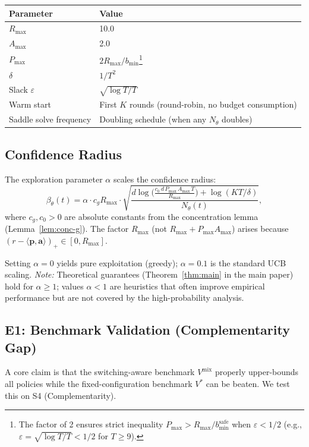 \documentclass[11pt]{article}
\newcommand{\ba}{\mathbf{a}}
\newcommand{\bp}{\mathbf{p}}
\begin{document}
\begin{center}
\begin{tabular}{ll}
\toprule
Parameter & Value \\
\midrule
$R_{\max}$ & 10.0 \\
$A_{\max}$ & 2.0 \\
$P_{\max}$ & $2R_{\max} / b_{\min}$\footnote{The factor of 2 ensures strict inequality $P_{\max} > R_{\max}/b^{\mathrm{safe}}_{\min}$ when $\varepsilon < 1/2$ (e.g., $\varepsilon = \sqrt{\log T/T} < 1/2$ for $T \ge 9$).} \\
$\delta$ & $1/T^2$ \\
Slack $\varepsilon$ & $\sqrt{\log T / T}$ \\
Warm start & First $K$ rounds (round-robin, no budget consumption) \\
Saddle solve frequency & Doubling schedule (when any $N_\theta$ doubles) \\
\bottomrule
\end{tabular}
\end{center}

\subsection{Confidence Radius}

The exploration parameter $\alpha$ scales the confidence radius:
\[
\beta_\theta(t) = \alpha \cdot c_g R_{\max} \cdot \sqrt{\frac{d \log\!\Big(\frac{c_0\,d\,P_{\max}\,A_{\max}\,T}{R_{\max}}\Big) + \log(KT/\delta)}{N_\theta(t)}},
\]
where $c_g, c_0 > 0$ are absolute constants from the concentration lemma (Lemma~\ref{lem:conc-g}). The factor $R_{\max}$ (not $R_{\max} + P_{\max} A_{\max}$) arises because $(r - \langle \bp, \ba \rangle)_+ \in [0, R_{\max}]$.

Setting $\alpha = 0$ yields pure exploitation (greedy); $\alpha = 0.1$ is the standard UCB scaling. \emph{Note:} Theoretical guarantees (Theorem~\ref{thm:main} in the main paper) hold for $\alpha \ge 1$; values $\alpha < 1$ are heuristics that often improve empirical performance but are not covered by the high-probability analysis.

\subsection{E1: Benchmark Validation (Complementarity Gap)}
\label{app:e1-benchmark}

A core claim is that the switching-aware benchmark $V^{\mathrm{mix}}$ properly upper-bounds all policies while the fixed-configuration benchmark $V^*$ can be beaten. We test this on S4 (Complementarity).
\end{document}
